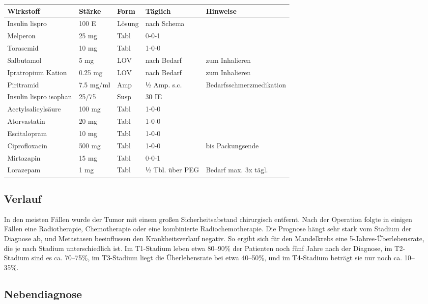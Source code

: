 \documentclass[a4paper,12pt]{article}
\begin{document}
\begin{longtable}{|p{4cm}|p{2cm}|p{2cm}|p{3cm}|p{5cm}|}
	\hline
	\textbf{Wirkstoff}     & \textbf{Stärke} & \textbf{Form} & \textbf{Täglich} & \textbf{Hinweise}        \\
	\hline
	Insulin lispro         & 100 E           & Lösung        & nach Schema      &                          \\
	\hline
	Melperon               & 25 mg           & Tabl          & 0-0-1            &                          \\
	\hline
	Torasemid              & 10 mg           & Tabl          & 1-0-0            &                          \\
	\hline
	Salbutamol             & 5 mg            & LOV           & nach Bedarf      & zum Inhalieren           \\
	\hline
	Ipratropium Kation     & 0.25 mg         & LOV           & nach Bedarf      & zum Inhalieren           \\
	\hline
	Piritramid             & 7.5 mg/ml       & Amp           & ½ Amp. s.c.      & Bedarfsschmerzmedikation \\
	\hline
	Insulin lispro isophan & 25/75           & Susp          & 30 IE            &                          \\
	\hline
	Acetylsalicylsäure     & 100 mg          & Tabl          & 1-0-0            &                          \\
	\hline
	Atorvastatin           & 20 mg           & Tabl          & 1-0-0            &                          \\
	\hline
	Escitalopram           & 10 mg           & Tabl          & 1-0-0            &                          \\
	\hline
	Ciprofloxacin          & 500 mg          & Tabl          & 1-0-0            & bis Packungsende         \\
	\hline
	Mirtazapin             & 15 mg           & Tabl          & 0-0-1            &                          \\
	\hline
	Lorazepam              & 1 mg            & Tabl          & ½ Tbl. über PEG  & Bedarf max. 3x tägl.     \\
	\hline
\end{longtable}

\subsection{Verlauf}
In den meisten Fällen wurde der Tumor mit einem großen Sicherheitsabstand chirurgisch
entfernt. Nach der Operation folgte in einigen Fällen eine Radiotherapie, Chemotherapie
oder eine kombinierte Radiochemotherapie. Die Prognose hängt sehr stark vom Stadium
der Diagnose ab, und Metastasen beeinflussen den Krankheitsverlauf negativ. So ergibt
sich für den Mandelkrebs eine 5-Jahres-Überlebensrate, die je nach Stadium unterschiedlich
ist. Im T1-Stadium leben etwa 80–90\% der Patienten noch fünf Jahre nach der Diagnose,
im T2-Stadium sind es ca. 70–75\%, im T3-Stadium liegt die Überlebensrate bei etwa
40–50\%, und im T4-Stadium beträgt sie nur noch ca. 10–35\%.

\subsection{Nebendiagnose}



\end{document}
